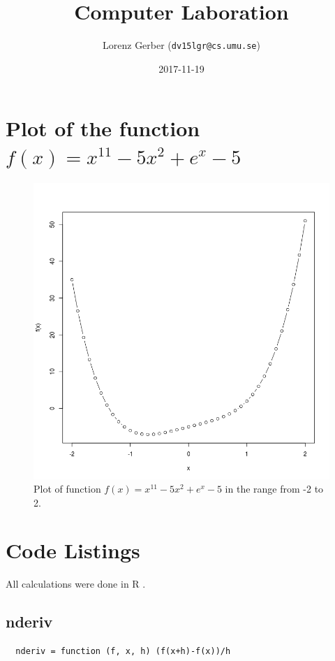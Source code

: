 \documentclass[a4paper,11pt,twoside]{article}
\title{Computer Laboration}
\author{Lorenz Gerber ({\tt{dv15lgr@cs.umu.se}})}
\date{2017-11-19}
\begin{document}
\lstset{language=R}
\maketitle
\thispagestyle{empty}
\newpage

\clearpage
{}

\section{Plot of the function $f(x) = x^{11}-5x^2+e^x-5$}

\begin{figure}[h!]
  \centering
  \includegraphics[width=1\textwidth]{plot1}
  \caption{Plot of function $f(x) = x^{11}-5x^2+e^x-5$ in the range from -2 to 2.}
\end{figure}

\section{Code Listings}
All calculations were done in R \cite{rlanguage}.
\subsection{nderiv}
\begin{lstlisting}
  nderiv = function (f, x, h) (f(x+h)-f(x))/h
\end{lstlisting}
\end{document}

